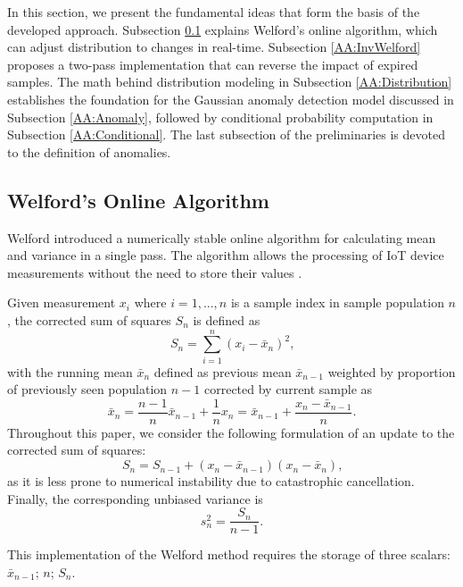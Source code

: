 In this section, we present the fundamental ideas that form the basis of the developed approach. Subsection \ref{AA:Welford} explains Welford's online algorithm, which can adjust distribution to changes in real-time. Subsection \ref{AA:InvWelford} proposes a two-pass implementation that can reverse the impact of expired samples. The math behind distribution modeling in Subsection \ref{AA:Distribution} establishes the foundation for the Gaussian anomaly detection model discussed in Subsection \ref{AA:Anomaly}, followed by conditional probability computation in Subsection \ref{AA:Conditional}. The last subsection of the preliminaries is devoted to the definition of anomalies.

\subsection{Welford's Online Algorithm}\label{AA:Welford}
Welford introduced a numerically stable online algorithm for calculating mean and variance in a single pass. The algorithm allows the processing of IoT device measurements without the need to store their values \cite{Wel62}.

Given measurement \(x_i\) where \(i=1,...,n\) is a sample index in sample population \(n\), the corrected sum of squares \(S_n\) is defined as
\begin{equation}
S_n = \sum_{i=1}^n (x_i - \bar x_n)^2\text{,}\label{eq:sumsquares}
\end{equation}
with the running mean \(\bar x_n\) defined as previous mean \(\bar x_{n-1}\) weighted by proportion of previously seen population \(n-1\) corrected by current sample as
\begin{equation}
\bar x_n = \frac{n-1}{n} \bar x_{n-1} + \frac{1}{n}x_n = \bar x_{n-1} + \frac{x_n - \bar x_{n-1}}{n}\text{.}\label{eq:runmean}
\end{equation}
Throughout this paper, we consider the following formulation of an update to the corrected sum of squares:
\begin{equation}
S_n = S_{n-1} + (x_n - \bar x_{n-1})(x_n - \bar x_n)\text{,}\label{eq:upsumsquares}
\end{equation}
as it is less prone to numerical instability due to catastrophic cancellation. Finally, the corresponding unbiased variance is
\begin{equation}
s^2_n = \frac{S_{n}}{n-1}\text{.}\label{eq:runvar}
\end{equation}

This implementation of the Welford method requires the storage of three scalars: \(\bar x_{n-1}\); \(n\); \(S_n\).

